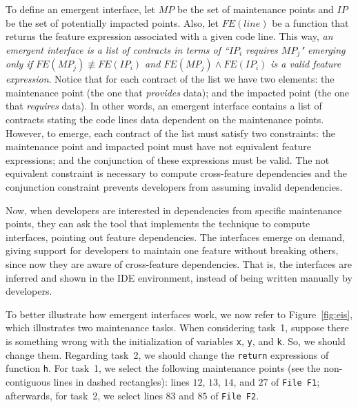 To define an emergent interface, let $MP$ be the set of maintenance points and $IP$ be the set of potentially impacted points. Also, let $FE(line)$ be a function that returns the feature expression associated with a given code line. This way, \textit{an emergent interface is a list of contracts in terms of ``$IP_i$ requires $MP_j$" emerging only if $FE(MP_j) \not\equiv FE(IP_i)$ and $FE(MP_j) \wedge FE(IP_i)$ is a valid feature expression}. Notice that for each contract of the list we have two elements: the maintenance point (the one that \textit{provides} data); and the impacted point (the one that \textit{requires} data). In other words, an emergent interface contains a list of contracts stating the code lines data dependent on the maintenance points. However, to emerge, each contract of the list must satisfy two constraints: the maintenance point and impacted point must have not equivalent feature expressions; and the conjunction of these expressions must be valid. The not equivalent constraint is necessary to compute cross-feature dependencies and the conjunction constraint prevents developers from assuming invalid dependencies.

Now, when developers are interested in dependencies from specific maintenance points, they can ask the tool that implements the technique to compute interfaces, pointing out feature dependencies. The interfaces emerge on demand, giving support for developers to maintain one feature without breaking others, since now they are aware of cross-feature dependencies. That is, the interfaces are inferred and shown in the IDE environment, instead of being written manually by developers.

To better illustrate how emergent interfaces work, we now refer to Figure~\ref{fig:eis}, which illustrates two maintenance tasks. When considering task~1, suppose there is something wrong with the initialization of variables \texttt{x}, \texttt{y}, and \texttt{k}. So, we should change them. Regarding task~2, we should change the \texttt{return} expressions of function \texttt{h}. For task~1, we select the following maintenance points (see the non-contiguous lines in dashed rectangles): lines $12$, $13$, $14$, and $27$ of \texttt{File F1}; afterwards, for task~2, we select lines $83$ and $85$ of \texttt{File F2}. 


